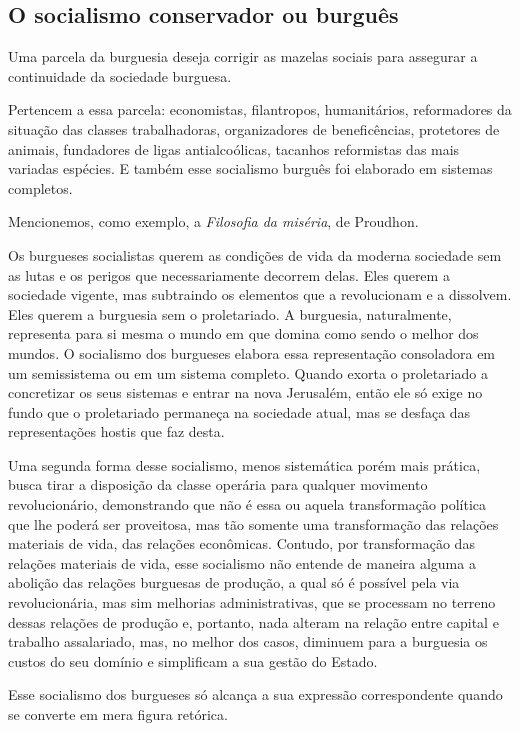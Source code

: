 \subsection{O socialismo conservador ou burguês}

Uma parcela da burguesia deseja corrigir as mazelas sociais para
assegurar a continuidade da sociedade burguesa.

Pertencem a essa parcela: economistas, filantropos, humanitários,
reformadores da situação das classes trabalhadoras, organizadores de
beneficências, protetores de animais, fundadores de ligas
antialcoólicas, tacanhos reformistas das mais variadas espécies. E
também esse socialismo burguês foi elaborado em sistemas completos.

Mencionemos, como exemplo, a \textit{Filosofia da miséria}, de
Proudhon.

Os burgueses socialistas querem as condições de vida da moderna
sociedade sem as lutas e os perigos que necessariamente decorrem delas.
Eles querem a sociedade vigente, mas subtraindo os elementos que a
revolucionam e a dissolvem. Eles querem a burguesia sem o proletariado.
A burguesia, naturalmente, representa para si mesma o mundo em que
domina como sendo o melhor dos mundos. O socialismo dos burgueses
elabora essa representação consoladora em um semissistema ou em um
sistema completo. Quando exorta o proletariado a concretizar os seus
sistemas e entrar na nova Jerusalém, então ele só exige no fundo que o
proletariado permaneça na sociedade atual, mas se desfaça das
representações hostis que faz desta.

Uma segunda forma desse socialismo, menos sistemática porém mais
prática, busca tirar a disposição da classe operária para qualquer
movimento revolucionário, demonstrando que não é essa ou aquela
transformação política que lhe poderá ser proveitosa, mas tão somente
uma transformação das relações materiais de vida, das relações
econômicas. Contudo, por transformação das relações materiais de vida,
esse socialismo não entende de maneira alguma a abolição das relações
burguesas de produção, a qual só é possível pela via revolucionária,
mas sim melhorias administrativas, que se processam no terreno dessas
relações de produção e, portanto, nada alteram na relação entre capital
e trabalho assalariado, mas, no melhor dos casos, diminuem para a
burguesia os custos do seu domínio e simplificam a sua gestão do
Estado.

Esse socialismo dos burgueses só alcança a sua expressão correspondente
quando se converte em mera figura retórica.

